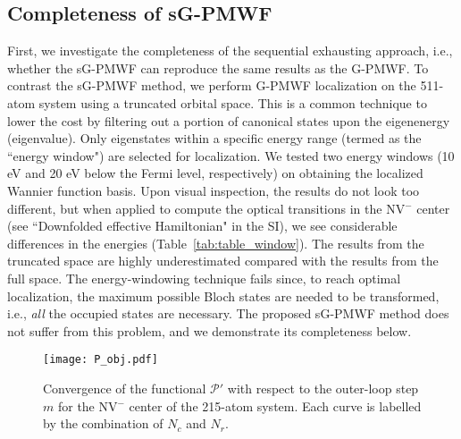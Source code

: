 \documentclass[journal=jacsat,manuscript=article]{achemso}
\begin{document}
\subsection{Completeness of sG-PMWF}
First, we investigate the completeness of the sequential exhausting approach, i.e., whether the sG-PMWF can reproduce the same results as the G-PMWF. To contrast the sG-PMWF method, we perform G-PMWF localization on the 511-atom system using a truncated orbital space. This is a common technique to lower the cost by filtering out a portion of canonical states upon the eigenenergy (eigenvalue). Only eigenstates within a specific energy range (termed as the ``energy window") are selected for localization. We tested two energy windows (10 eV and 20 eV below the Fermi level, respectively) on obtaining the localized Wannier function basis. Upon visual inspection, the results do not look too different, but when applied to compute the optical transitions in the NV$^-$ center (see ``Downfolded effective Hamiltonian" in the SI), we see considerable differences in the energies (Table~\ref{tab:table_window}). The results from the truncated space are highly underestimated compared with the results from the full space. The energy-windowing technique fails since, to reach optimal localization, the maximum possible Bloch states are needed to be transformed, i.e., \textit{all} the occupied states are necessary. The proposed sG-PMWF method does not suffer from this problem, and we demonstrate its completeness below.

\begin{figure}
    \centering
    \texttt{[image: P\_obj.pdf]}
    \caption{Convergence of the functional $\mathcal{P}'$ with respect to the outer-loop step $m$ for the NV$^-$ center of the 215-atom system. Each curve is labelled by the combination of $N_c$ and $N_r$.}
    \label{fig:fig_steps_P_obj}
\end{figure}
\end{document}
